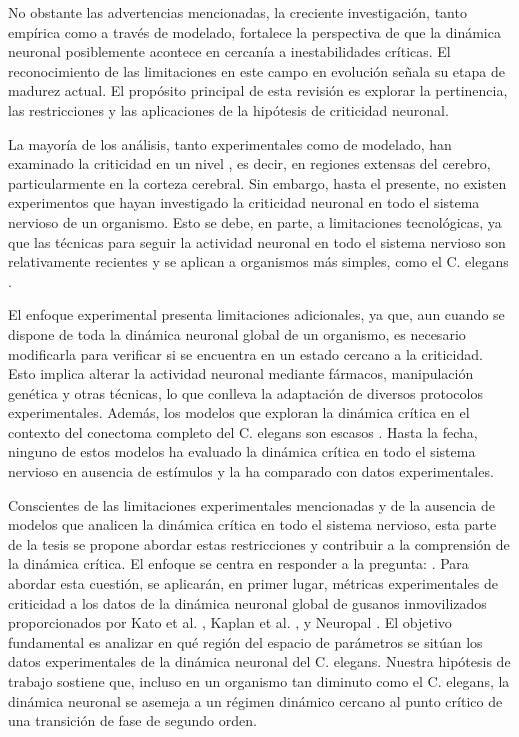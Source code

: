 No obstante las advertencias mencionadas, la creciente investigación, tanto empírica como a través de modelado, fortalece la perspectiva de que la dinámica neuronal posiblemente acontece en cercanía a inestabilidades críticas. El reconocimiento de las limitaciones en este campo en evolución señala su etapa de madurez actual. El propósito principal de esta revisión es explorar la pertinencia, las restricciones y las aplicaciones de la hipótesis de criticidad neuronal.

La mayoría de los análisis, tanto experimentales como de modelado, han examinado la criticidad en un nivel , es decir, en regiones extensas del cerebro, particularmente en la corteza cerebral. Sin embargo, hasta el presente, no existen experimentos que hayan investigado la criticidad neuronal en todo el sistema nervioso de un organismo. Esto se debe, en parte, a limitaciones tecnológicas, ya que las técnicas para seguir la actividad neuronal en todo el sistema nervioso son relativamente recientes y se aplican a organismos más simples, como el C. elegans \cite{kato_global_2015,kaplan_nested_2020,yemini_neuropal_2021}.


El enfoque experimental presenta limitaciones adicionales, ya que, aun cuando se dispone de toda la dinámica neuronal global de un organismo, es necesario modificarla para verificar si se encuentra en un estado cercano a la criticidad. Esto implica alterar la actividad neuronal mediante fármacos, manipulación genética y otras técnicas, lo que conlleva la adaptación de diversos protocolos experimentales. Además, los modelos que exploran la dinámica crítica en el contexto del conectoma completo del C. elegans son escasos \cite{ciftci_synaptic_2018}. Hasta la fecha, ninguno de estos modelos ha evaluado la dinámica crítica en todo el sistema nervioso en ausencia de estímulos y la ha comparado con datos experimentales.

Conscientes de las limitaciones experimentales mencionadas y de la ausencia de modelos que analicen la dinámica crítica en todo el sistema nervioso, esta parte de la tesis se propone abordar estas restricciones y contribuir a la comprensión de la dinámica crítica. El enfoque se centra en responder a la pregunta: . Para abordar esta cuestión, se aplicarán, en primer lugar, métricas experimentales de criticidad a los datos de la dinámica neuronal global de gusanos inmovilizados proporcionados por Kato et al. \cite{kato_global_2015}, Kaplan et al. \cite{kaplan_nested_2020}, y Neuropal \cite{yemini_neuropal_2021}. El objetivo fundamental es analizar en qué región del espacio de parámetros se sitúan los datos experimentales de la dinámica neuronal del C. elegans. Nuestra hipótesis de trabajo sostiene que, incluso en un organismo tan diminuto como el C. elegans, la dinámica neuronal se asemeja a un régimen dinámico cercano al punto crítico de una transición de fase de segundo orden.

